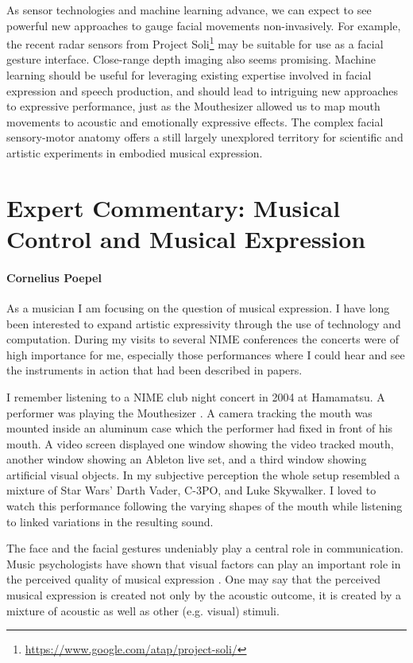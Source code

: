 As sensor technologies and machine learning advance, we can expect to see powerful new approaches to gauge facial movements non-invasively. For example, the recent radar sensors from Project Soli\footnote{\url{https://www.google.com/atap/project-soli/}} may be suitable for use as a facial gesture interface. Close-range depth imaging also seems promising. Machine learning should be useful for leveraging existing expertise involved in facial expression and speech production, and should lead to intriguing new approaches to expressive performance, just as the Mouthesizer allowed us to map mouth movements to acoustic and emotionally expressive effects. The complex facial sensory-motor anatomy offers a still largely unexplored territory for scientific and artistic experiments in embodied musical expression. 

\section*{Expert Commentary: Musical Control and Musical Expression}
\paragraph{Cornelius Poepel}

As a musician I am focusing on the question of musical expression. I have long been interested to expand artistic expressivity through the use of technology and computation. During my visits to several NIME conferences the concerts were of high importance for me, especially those performances where I could hear and see the instruments in action that had been described in papers. 

I remember listening to a NIME club night concert in 2004 at Hamamatsu. A performer was playing the Mouthesizer \cite{Lyons:2003}. A camera tracking the mouth was mounted inside an aluminum  case which the performer had fixed in front of his mouth. A video screen displayed one window showing the video tracked mouth, another window showing an Ableton live set, and a third window showing artificial visual objects. In my subjective perception the whole setup resembled a mixture of Star Wars' Darth Vader, C-3PO, and Luke Skywalker. I loved to watch this performance following the varying shapes of the mouth while listening to linked variations in the resulting sound. 

The face and the facial gestures undeniably play a central role in communication. Music psychologists have shown that visual factors can play an important role in the perceived quality of musical expression \cite{Behne:2011}. One may say that the perceived musical expression is created not only by the acoustic outcome, it is created by a mixture of acoustic as well as other (e.g. visual) stimuli. 

